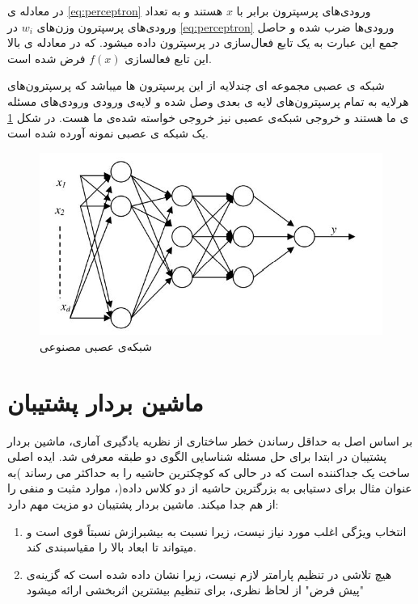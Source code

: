 در معادله ی \ref{eq:perceptron} ورودی‌های پرسپترون برابر با $x$ هستند و به تعداد ورودی‌های پرسپترون وزن‌های ‌$w_i$ در \ref{eq:perceptron} ورودی‌ها ضرب شده و حاصل جمع این عبارت به یک تابع فعال‌سازی در 
پرسپترون داده میشود. که در معادله ی بالا این تابع فعالسازی $f(x)$ فرض شده است.

شبکه ی عصبی مجموعه ای چندلایه از این پرسپترون ها میباشد که پرسپترون‌های هرلایه به تمام پرسپترون‌های لایه ی بعدی وصل شده و لایه‌ی ورودی ورودی‌های مسئله ی ما هستند و خروجی شبکه‌ی عصبی نیز خروجی خواسته شده‌ی ما هست.
در شکل \ref{fig:ann} یک شبکه ی عصبی نمونه آورده شده است.

\begin{figure}[ht!]
    \begin{center}
        \includegraphics[width=12cm]{images/ANN.jpg}
    \end{center}
    \caption[شبکه‌ی عصبی مصنوعی]{شبکه‌ی عصبی مصنوعی}
    \label{fig:ann}
    \end{figure}

\section{ماشین بردار پشتیبان}

بر اساس اصل به حداقل رساندن خطر ساختاری از نظریه یادگیری آماری، ماشین بردار پشتیبان در ابتدا برای حل مسئله
شناسایی الگوی دو طبقه معرفی شد. ایده اصلی ساخت یک جداکننده است که در حالی که کوچکترین حاشیه را به حداکثر می
رساند )به عنوان مثال برای دستیابی به بزرگترین حاشیه از دو کلاس داده(، موارد مثبت و منفی را از هم جدا میکند. ماشین بردار
پشتیبان دو مزیت مهم دارد:
\begin{enumerate}
    \item انتخاب ویژگی اغلب مورد نیاز نیست، زیرا نسبت به بیشبرازش نسبتاً قوی است و میتواند تا
    ابعاد بالا را مقیاسبندی کند.
    \item هیچ تلاشی در تنظیم پارامتر لازم نیست، زیرا نشان داده شده است که گزینه‌ی "پیش فرض" از
    لحاظ نظری، برای تنظیم بیشترین اثربخشی ارائه میشود
\end{enumerate} 

